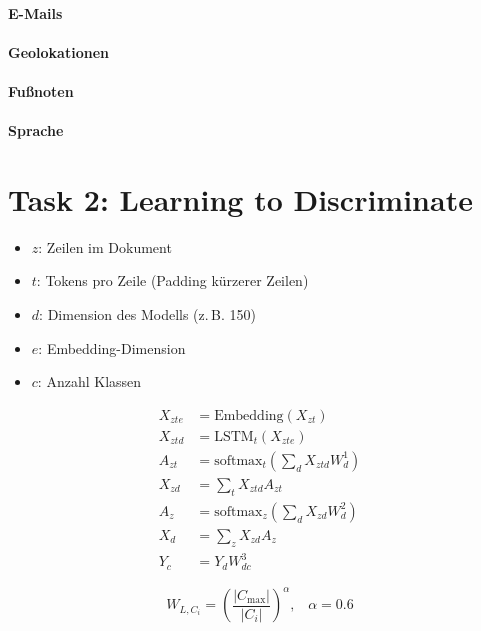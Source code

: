\documentclass[bachelor,german]{info1thesis}
\begin{document}
\paragraph{E-Mails}
\paragraph{Geolokationen}
\paragraph{Fußnoten}
\paragraph{Sprache}

\section{Task 2: Learning to Discriminate}

\begin{itemize}
\itemsep-.5em
\item $z$: Zeilen im Dokument
\item $t$: Tokens pro Zeile (Padding kürzerer Zeilen)
\item $d$: Dimension des Modells (z.\,B. 150)
\item $e$: Embedding-Dimension
\item $c$: Anzahl Klassen
\end{itemize}

\begin{align}
X_{zte} &= \text{Embedding}(X_{zt}) \\ \label{eq:embedding}
X_{ztd} &= \text{LSTM}_t(X_{zte}) \\
A_{zt} &= \text{softmax}_t\left(\sum_d X_{ztd} W_{d}^1\right) \\
X_{zd} &= \sum_t X_{ztd} A_{zt} \\ \label{eq:zd}
A_{z} &= \text{softmax}_z\left(\sum_d X_{zd} W_{d}^2\right) \\
X_{d} &= \sum_z X_{zd} A_z \\
Y_c &= Y_d W_{dc}^3 \label{eq:classification}
\end{align}


\begin{equation}
W_{L,C_i} = \left(\frac{|C_{\max}|}{|C_i|}\right)^\alpha,\;\;\;\alpha = 0.6
\end{equation}

\end{document}
